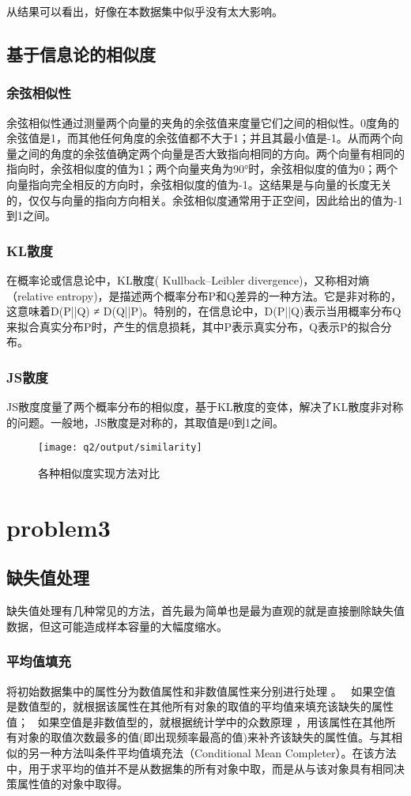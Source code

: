 \documentclass[UTF8]{ctexart}
\begin{document}
从结果可以看出，好像在本数据集中似乎没有太大影响。

\subsection{基于信息论的相似度}
\subsubsection{余弦相似性}
余弦相似性通过测量两个向量的夹角的余弦值来度量它们之间的相似性。0度角的余弦值是1，而其他任何角度的余弦值都不大于1；并且其最小值是-1。从而两个向量之间的角度的余弦值确定两个向量是否大致指向相同的方向。两个向量有相同的指向时，余弦相似度的值为1；两个向量夹角为90°时，余弦相似度的值为0；两个向量指向完全相反的方向时，余弦相似度的值为-1。这结果是与向量的长度无关的，仅仅与向量的指向方向相关。余弦相似度通常用于正空间，因此给出的值为-1到1之间。
\subsubsection{KL散度}
在概率论或信息论中，KL散度( Kullback–Leibler divergence)，又称相对熵（relative entropy)，是描述两个概率分布P和Q差异的一种方法。它是非对称的，这意味着D(P||Q) ≠ D(Q||P)。特别的，在信息论中，D(P||Q)表示当用概率分布Q来拟合真实分布P时，产生的信息损耗，其中P表示真实分布，Q表示P的拟合分布。
\subsubsection{JS散度}
JS散度度量了两个概率分布的相似度，基于KL散度的变体，解决了KL散度非对称的问题。一般地，JS散度是对称的，其取值是0到1之间。

\begin{figure}[H]
	\centering
	\texttt{[image: q2/output/similarity]}
	\caption{各种相似度实现方法对比}
\end{figure}

\clearpage

\section{problem3}
\subsection{缺失值处理}
缺失值处理有几种常见的方法，首先最为简单也是最为直观的就是直接删除缺失值数据，但这可能造成样本容量的大幅度缩水。
\subsubsection{平均值填充}
将初始数据集中的属性分为数值属性和非数值属性来分别进行处理 。  
如果空值是数值型的，就根据该属性在其他所有对象的取值的平均值来填充该缺失的属性值；  
如果空值是非数值型的，就根据统计学中的众数原理 ，用该属性在其他所有对象的取值次数最多的值(即出现频率最高的值)来补齐该缺失的属性值。与其相似的另一种方法叫条件平均值填充法（Conditional Mean Completer）。在该方法中，用于求平均的值并不是从数据集的所有对象中取，而是从与该对象具有相同决策属性值的对象中取得。  
\end{document}
